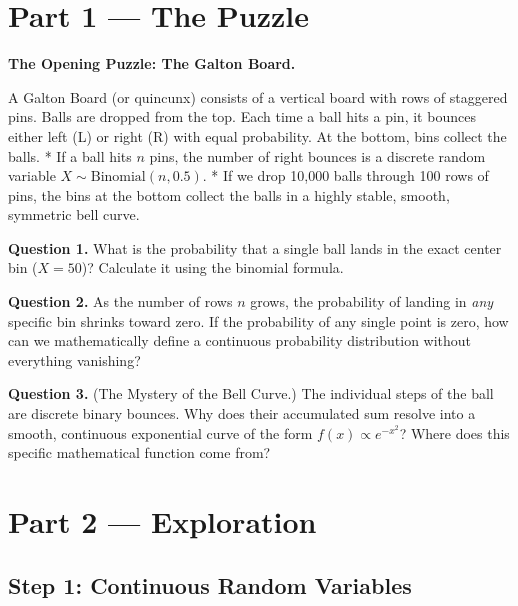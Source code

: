 \documentclass[12pt, a4paper]{article}
\begin{document}
\newpage

\section{Part 1 \texorpdfstring{---}{--} The Puzzle}

\begin{puzzlebox}
\textbf{The Opening Puzzle: The Galton Board.}

A Galton Board (or quincunx) consists of a vertical board with rows of staggered pins. Balls are dropped from the top. Each time a ball hits a pin, it bounces either left (L) or right (R) with equal probability. At the bottom, bins collect the balls.
* If a ball hits $n$ pins, the number of right bounces is a discrete random variable $X \sim \text{Binomial}(n, 0.5)$.
* If we drop 10,000 balls through 100 rows of pins, the bins at the bottom collect the balls in a highly stable, smooth, symmetric bell curve.

\medskip
\textbf{Question 1.} What is the probability that a single ball lands in the exact center bin ($X = 50$)? Calculate it using the binomial formula.

\textbf{Question 2.} As the number of rows $n$ grows, the probability of landing in \emph{any} specific bin shrinks toward zero. If the probability of any single point is zero, how can we mathematically define a continuous probability distribution without everything vanishing?

\textbf{Question 3.} (The Mystery of the Bell Curve.) The individual steps of the ball are discrete binary bounces. Why does their accumulated sum resolve into a smooth, continuous exponential curve of the form $f(x) \propto e^{-x^2}$? Where does this specific mathematical function come from?
\end{puzzlebox}

\newpage

\section{Part 2 \texorpdfstring{---}{--} Exploration}

\subsection{Step 1: Continuous Random Variables}
\end{document}
